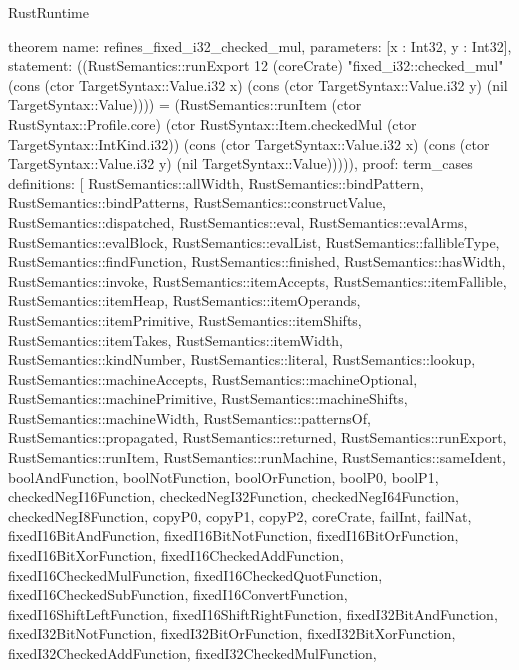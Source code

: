 \begin{lexlean}{RustRuntime}
\begin{semanticmodule}
theorem{
  name: refines_fixed_i32_checked_mul,
  parameters: [x : Int32, y : Int32],
  statement: ((RustSemantics::runExport 12 (coreCrate) "fixed_i32::checked_mul" (cons (ctor TargetSyntax::Value.i32 x) (cons (ctor TargetSyntax::Value.i32 y) (nil TargetSyntax::Value)))) = (RustSemantics::runItem (ctor RustSyntax::Profile.core) (ctor RustSyntax::Item.checkedMul (ctor TargetSyntax::IntKind.i32)) (cons (ctor TargetSyntax::Value.i32 x) (cons (ctor TargetSyntax::Value.i32 y) (nil TargetSyntax::Value))))),
  proof: term_cases{
    definitions: [
      RustSemantics::allWidth,
      RustSemantics::bindPattern,
      RustSemantics::bindPatterns,
      RustSemantics::constructValue,
      RustSemantics::dispatched,
      RustSemantics::eval,
      RustSemantics::evalArms,
      RustSemantics::evalBlock,
      RustSemantics::evalList,
      RustSemantics::fallibleType,
      RustSemantics::findFunction,
      RustSemantics::finished,
      RustSemantics::hasWidth,
      RustSemantics::invoke,
      RustSemantics::itemAccepts,
      RustSemantics::itemFallible,
      RustSemantics::itemHeap,
      RustSemantics::itemOperands,
      RustSemantics::itemPrimitive,
      RustSemantics::itemShifts,
      RustSemantics::itemTakes,
      RustSemantics::itemWidth,
      RustSemantics::kindNumber,
      RustSemantics::literal,
      RustSemantics::lookup,
      RustSemantics::machineAccepts,
      RustSemantics::machineOptional,
      RustSemantics::machinePrimitive,
      RustSemantics::machineShifts,
      RustSemantics::machineWidth,
      RustSemantics::patternsOf,
      RustSemantics::propagated,
      RustSemantics::returned,
      RustSemantics::runExport,
      RustSemantics::runItem,
      RustSemantics::runMachine,
      RustSemantics::sameIdent,
      boolAndFunction,
      boolNotFunction,
      boolOrFunction,
      boolP0,
      boolP1,
      checkedNegI16Function,
      checkedNegI32Function,
      checkedNegI64Function,
      checkedNegI8Function,
      copyP0,
      copyP1,
      copyP2,
      coreCrate,
      failInt,
      failNat,
      fixedI16BitAndFunction,
      fixedI16BitNotFunction,
      fixedI16BitOrFunction,
      fixedI16BitXorFunction,
      fixedI16CheckedAddFunction,
      fixedI16CheckedMulFunction,
      fixedI16CheckedQuotFunction,
      fixedI16CheckedSubFunction,
      fixedI16ConvertFunction,
      fixedI16ShiftLeftFunction,
      fixedI16ShiftRightFunction,
      fixedI32BitAndFunction,
      fixedI32BitNotFunction,
      fixedI32BitOrFunction,
      fixedI32BitXorFunction,
      fixedI32CheckedAddFunction,
      fixedI32CheckedMulFunction,
}}
\end{semanticmodule}
\end{lexlean}
